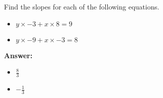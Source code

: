  Find the slopes for each of the following equations. \begin{itemize}\item \( y \times -3 + x \times 8 = 9 \)\item \( y \times -9 + x \times -3 = 8 \)\end{itemize}

        \textbf{Answer:} \begin{itemize}\item \( \frac{8}{3} \)\item \( -\frac{1}{3} \)\end{itemize}
